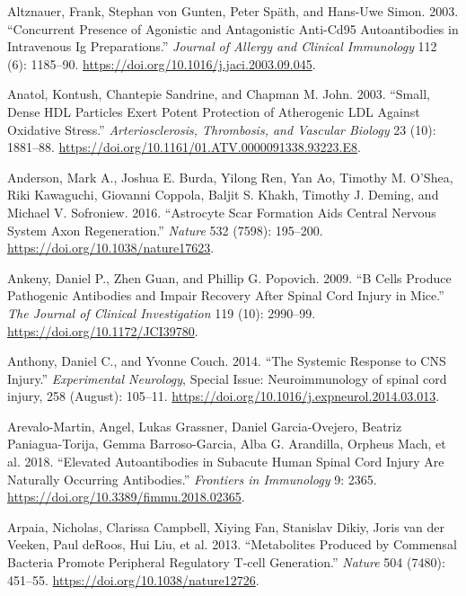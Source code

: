 \documentclass[9pt,lineno]{elife}
\newlength{\cslhangindent}
\newlength{\cslentryspacingunit} %
\newenvironment{CSLReferences}[2] %
 {%
  \setlength{\parindent}{0pt}
  \ifodd #1
  \let\oldpar\par
  \def\par{\hangindent=\cslhangindent\oldpar}
  \fi
  \setlength{\parskip}{#2\cslentryspacingunit}
 }%
 {}
\begin{document}
\begin{landscape}
\begin{landscape}
\begin{landscape}
\begin{landscape}
\begin{CSLReferences}{1}{0}
\leavevmode{}%
Altznauer, Frank, Stephan von Gunten, Peter Späth, and Hans-Uwe Simon. 2003. {``Concurrent Presence of Agonistic and Antagonistic Anti-{Cd95} Autoantibodies in Intravenous {Ig} Preparations.''} \emph{Journal of Allergy and Clinical Immunology} 112 (6): 1185--90. \url{https://doi.org/10.1016/j.jaci.2003.09.045}.

\leavevmode{}%
Anatol, Kontush, Chantepie Sandrine, and Chapman M. John. 2003. {``Small, {Dense HDL Particles Exert Potent Protection} of {Atherogenic LDL Against Oxidative Stress}.''} \emph{Arteriosclerosis, Thrombosis, and Vascular Biology} 23 (10): 1881--88. \url{https://doi.org/10.1161/01.ATV.0000091338.93223.E8}.

\leavevmode{}%
Anderson, Mark A., Joshua E. Burda, Yilong Ren, Yan Ao, Timothy M. O'Shea, Riki Kawaguchi, Giovanni Coppola, Baljit S. Khakh, Timothy J. Deming, and Michael V. Sofroniew. 2016. {``Astrocyte Scar Formation Aids Central Nervous System Axon Regeneration.''} \emph{Nature} 532 (7598): 195--200. \url{https://doi.org/10.1038/nature17623}.

\leavevmode{}%
Ankeny, Daniel P., Zhen Guan, and Phillip G. Popovich. 2009. {``B Cells Produce Pathogenic Antibodies and Impair Recovery After Spinal Cord Injury in Mice.''} \emph{The Journal of Clinical Investigation} 119 (10): 2990--99. \url{https://doi.org/10.1172/JCI39780}.

\leavevmode{}%
Anthony, Daniel C., and Yvonne Couch. 2014. {``The Systemic Response to {CNS} Injury.''} \emph{Experimental Neurology}, Special {Issue}: {Neuroimmunology} of spinal cord injury, 258 (August): 105--11. \url{https://doi.org/10.1016/j.expneurol.2014.03.013}.

\leavevmode{}%
Arevalo-Martin, Angel, Lukas Grassner, Daniel Garcia-Ovejero, Beatriz Paniagua-Torija, Gemma Barroso-Garcia, Alba G. Arandilla, Orpheus Mach, et al. 2018. {``Elevated {Autoantibodies} in {Subacute Human Spinal Cord Injury Are Naturally Occurring Antibodies}.''} \emph{Frontiers in Immunology} 9: 2365. \url{https://doi.org/10.3389/fimmu.2018.02365}.

\leavevmode{}%
Arpaia, Nicholas, Clarissa Campbell, Xiying Fan, Stanislav Dikiy, Joris van der Veeken, Paul deRoos, Hui Liu, et al. 2013. {``Metabolites Produced by Commensal Bacteria Promote Peripheral Regulatory {T-cell} Generation.''} \emph{Nature} 504 (7480): 451--55. \url{https://doi.org/10.1038/nature12726}.


\end{CSLReferences}
\end{landscape}
\end{landscape}
\end{landscape}
\end{landscape}
\end{document}
